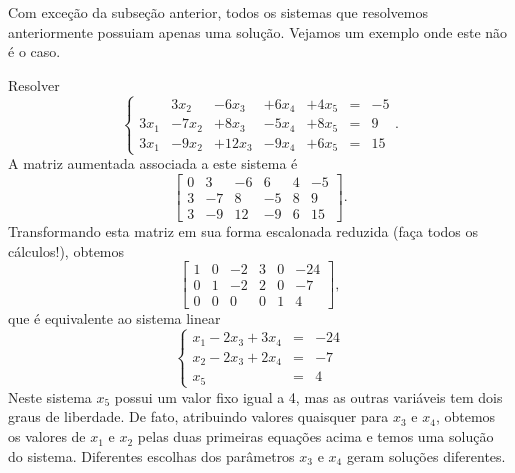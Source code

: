 Com exceção da subseção anterior, todos os sistemas que resolvemos anteriormente possuiam apenas uma solução. Vejamos um exemplo onde este não é o caso.

\begin{ex}
Resolver
\begin{equation}
\left\{
  \begin{array}{rrrrrrl}
     & 3 x_2 & -6x_3 & + 6x_4 & + 4x_5 &=& -5\\
    3x_1 & -7x_2 & +8x_3 & -5 x_4 & + 8x_5 &=& 9\\
    3x_1 & -9x_2 & +12x_3 & -9x_4 & +6x_5 &=& 15
  \end{array}
\right. .
\end{equation} A matriz aumentada associada a este sistema é
\begin{equation}
\left[
  \begin{array}{ccccc|c}
    0 &  3 & -6 &  6 & 4 & -5 \\
    3 & -7 &  8 & -5 & 8 &  9 \\
    3 & -9 & 12 & -9 & 6 & 15
  \end{array}
\right] .
\end{equation} Transformando esta matriz em sua forma escalonada reduzida (faça todos os cálculos!), obtemos
\begin{equation}
\left[
  \begin{array}{ccccc|c}
    1 & 0 & -2 & 3 & 0 & -24 \\
    0 & 1 & -2 & 2 & 0 &  -7 \\
    0 & 0 &  0 & 0 & 1 &   4
  \end{array}
\right],
\end{equation} que é equivalente ao sistema linear
\begin{equation}
\left\{
  \begin{array}{rcl}
      x_1 - 2 x_3 + 3 x_4 &=& -24\\
      x_2 - 2 x_3 + 2 x_4  &=& -7\\
      x_5 &=& 4
  \end{array}
\right.
\end{equation} Neste sistema $x_5$ possui um valor fixo igual a 4, mas as outras variáveis tem dois graus de liberdade. De fato, atribuindo valores quaisquer para $x_3$ e $x_4$, obtemos os valores de $x_1$ e $x_2$ pelas duas primeiras equações acima e temos uma solução do sistema. Diferentes escolhas dos parâmetros $x_3$ e $x_4$ geram soluções diferentes.


\end{ex}
